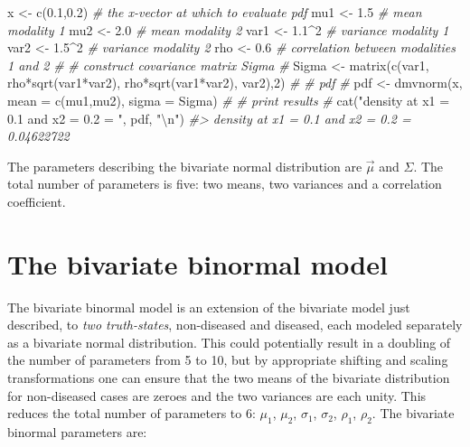 \documentclass[
]{book}
\newenvironment{Shaded}{\begin{snugshade}}{\end{snugshade}}
\newcommand{\AttributeTok}[1]{\textcolor[rgb]{0.77,0.63,0.00}{#1}}
\newcommand{\CommentTok}[1]{\textcolor[rgb]{0.56,0.35,0.01}{\textit{#1}}}
\newcommand{\DecValTok}[1]{\textcolor[rgb]{0.00,0.00,0.81}{#1}}
\newcommand{\FloatTok}[1]{\textcolor[rgb]{0.00,0.00,0.81}{#1}}
\newcommand{\FunctionTok}[1]{\textcolor[rgb]{0.00,0.00,0.00}{#1}}
\newcommand{\NormalTok}[1]{#1}
\newcommand{\OtherTok}[1]{\textcolor[rgb]{0.56,0.35,0.01}{#1}}
\newcommand{\SpecialCharTok}[1]{\textcolor[rgb]{0.00,0.00,0.00}{#1}}
\newcommand{\StringTok}[1]{\textcolor[rgb]{0.31,0.60,0.02}{#1}}
\begin{document}
\begin{Shaded}
\begin{Highlighting}[]
\NormalTok{x }\OtherTok{\textless{}{-}} \FunctionTok{c}\NormalTok{(}\FloatTok{0.1}\NormalTok{,}\FloatTok{0.2}\NormalTok{) }\CommentTok{\# the x{-}vector at which to evaluate pdf}
\NormalTok{mu1 }\OtherTok{\textless{}{-}} \FloatTok{1.5} \CommentTok{\# mean modality 1}
\NormalTok{mu2 }\OtherTok{\textless{}{-}} \FloatTok{2.0} \CommentTok{\# mean modality 2}
\NormalTok{var1 }\OtherTok{\textless{}{-}} \FloatTok{1.1}\SpecialCharTok{\^{}}\DecValTok{2}  \CommentTok{\# variance modality 1}
\NormalTok{var2 }\OtherTok{\textless{}{-}} \FloatTok{1.5}\SpecialCharTok{\^{}}\DecValTok{2} \CommentTok{\# variance modality 2}
\NormalTok{rho }\OtherTok{\textless{}{-}} \FloatTok{0.6} \CommentTok{\# correlation between modalities 1 and 2}
\CommentTok{\#}
\CommentTok{\# construct covariance matrix Sigma}
\CommentTok{\# }
\NormalTok{Sigma }\OtherTok{\textless{}{-}} \FunctionTok{matrix}\NormalTok{(}\FunctionTok{c}\NormalTok{(var1, rho}\SpecialCharTok{*}\FunctionTok{sqrt}\NormalTok{(var1}\SpecialCharTok{*}\NormalTok{var2), }
\NormalTok{                  rho}\SpecialCharTok{*}\FunctionTok{sqrt}\NormalTok{(var1}\SpecialCharTok{*}\NormalTok{var2), var2),}\DecValTok{2}\NormalTok{)}
\CommentTok{\#}
\CommentTok{\# pdf }
\CommentTok{\# }
\NormalTok{pdf  }\OtherTok{\textless{}{-}} \FunctionTok{dmvnorm}\NormalTok{(x, }\AttributeTok{mean =} \FunctionTok{c}\NormalTok{(mu1,mu2), }\AttributeTok{sigma =}\NormalTok{ Sigma)}
\CommentTok{\#}
\CommentTok{\# print results}
\CommentTok{\# }
\FunctionTok{cat}\NormalTok{(}\StringTok{"density at x1 = 0.1 and x2 = 0.2 = "}\NormalTok{, pdf, }\StringTok{"}\SpecialCharTok{\textbackslash{}n}\StringTok{"}\NormalTok{)}
\CommentTok{\#\textgreater{} density at x1 = 0.1 and x2 = 0.2 =  0.04622722}
\end{Highlighting}
\end{Shaded}

The parameters describing the bivariate normal distribution are \(\overrightarrow{\mu}\) and \(\Sigma\). The total number of parameters is five: two means, two variances and a correlation coefficient.

\hypertarget{bivariate-binormal-model-formulae}{%
\section{The bivariate binormal model}\label{bivariate-binormal-model-formulae}}

The bivariate binormal model is an extension of the bivariate model just described, to \emph{two truth-states}, non-diseased and diseased, each modeled separately as a bivariate normal distribution. This could potentially result in a doubling of the number of parameters from 5 to 10, but by appropriate shifting and scaling transformations one can ensure that the two means of the bivariate distribution for non-diseased cases are zeroes and the two variances are each unity. This reduces the total number of parameters to 6: \(\mu_1\), \(\mu_2\), \(\sigma_1\), \(\sigma_2\), \(\rho_1\), \(\rho_2\). The bivariate binormal parameters are:
\end{document}
